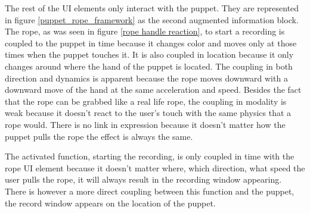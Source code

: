 The rest of the UI elements only interact with the puppet. They are represented in figure \ref{puppet_rope_framework} as the second augmented information block. The rope, as was seen in figure \ref{rope handle reaction}, to start a recording is coupled to the puppet in time because it changes color and moves only at those times when the puppet touches it. It is also coupled in location because it only changes around where the hand of the puppet is located. The coupling in both direction and dynamics is apparent because the rope moves downward with a downward move of the hand at the same acceleration and speed. Besides the fact that the rope can be grabbed like a real life rope, the coupling in modality is weak because it doesn't react to the user's touch with the same physics that a rope would. There is no link in expression because it doesn't matter how the puppet pulls the rope the effect is always the same.


The activated function, starting the recording, is only coupled in time with the rope UI element because it doesn't matter where, which direction, what speed the user pulls the rope, it will always result in the recording window appearing. There is however a more direct coupling between this function and the puppet, the record window appears on the location of the puppet.

